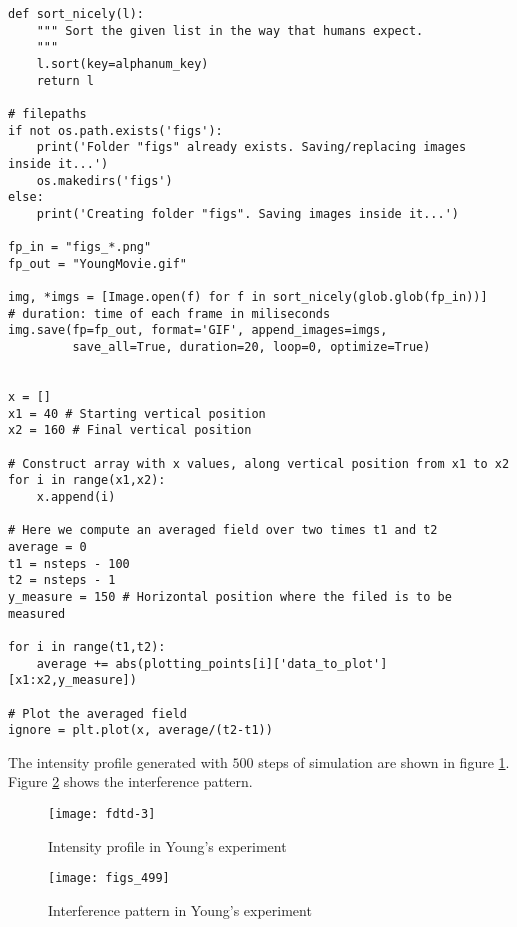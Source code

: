 \documentclass[11pt]{article}
\numberwithin{equation}{section}
\begin{document}
\begin{verbatim}
def sort_nicely(l):
    """ Sort the given list in the way that humans expect.
    """
    l.sort(key=alphanum_key)
    return l

# filepaths
if not os.path.exists('figs'):
    print('Folder "figs" already exists. Saving/replacing images inside it...')
    os.makedirs('figs')
else:
    print('Creating folder "figs". Saving images inside it...')
    
fp_in = "figs_*.png"
fp_out = "YoungMovie.gif"

img, *imgs = [Image.open(f) for f in sort_nicely(glob.glob(fp_in))]
# duration: time of each frame in miliseconds
img.save(fp=fp_out, format='GIF', append_images=imgs,
         save_all=True, duration=20, loop=0, optimize=True) 


x = []
x1 = 40 # Starting vertical position
x2 = 160 # Final vertical position

# Construct array with x values, along vertical position from x1 to x2
for i in range(x1,x2):
    x.append(i)
    
# Here we compute an averaged field over two times t1 and t2
average = 0
t1 = nsteps - 100
t2 = nsteps - 1
y_measure = 150 # Horizontal position where the filed is to be measured

for i in range(t1,t2):
    average += abs(plotting_points[i]['data_to_plot'][x1:x2,y_measure])

# Plot the averaged field
ignore = plt.plot(x, average/(t2-t1))
\end{verbatim}

The intensity profile generated with $500$ steps of simulation are 
shown in figure \ref{f4}. Figure \ref{f5} shows the interference 
pattern.
\begin{figure}
\centering
\texttt{[image: fdtd-3]}
\caption{Intensity profile in Young's experiment}\label{f4}
\end{figure}

\begin{figure}
\centering
\texttt{[image: figs\_499]}
\caption{Interference pattern in Young's experiment}\label{f5}
\end{figure}




\end{document}
